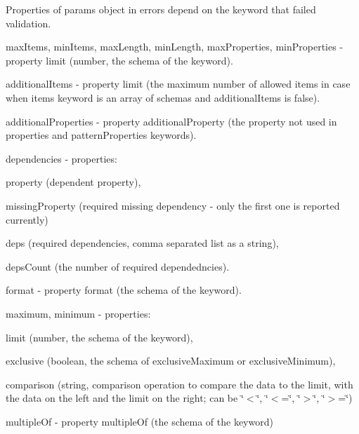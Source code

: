 Properties of {\ttfamily params} object in errors depend on the keyword that failed validation.


\begin{DoxyItemize}
\item {\ttfamily max\+Items}, {\ttfamily min\+Items}, {\ttfamily max\+Length}, {\ttfamily min\+Length}, {\ttfamily max\+Properties}, {\ttfamily min\+Properties} -\/ property {\ttfamily limit} (number, the schema of the keyword).
\item {\ttfamily additional\+Items} -\/ property {\ttfamily limit} (the maximum number of allowed items in case when {\ttfamily items} keyword is an array of schemas and {\ttfamily additional\+Items} is false).
\item {\ttfamily additional\+Properties} -\/ property {\ttfamily additional\+Property} (the property not used in {\ttfamily properties} and {\ttfamily pattern\+Properties} keywords).
\item {\ttfamily dependencies} -\/ properties\+:
\begin{DoxyItemize}
\item {\ttfamily property} (dependent property),
\item {\ttfamily missing\+Property} (required missing dependency -\/ only the first one is reported currently)
\item {\ttfamily deps} (required dependencies, comma separated list as a string),
\item {\ttfamily deps\+Count} (the number of required dependedncies).
\end{DoxyItemize}
\item {\ttfamily format} -\/ property {\ttfamily format} (the schema of the keyword).
\item {\ttfamily maximum}, {\ttfamily minimum} -\/ properties\+:
\begin{DoxyItemize}
\item {\ttfamily limit} (number, the schema of the keyword),
\item {\ttfamily exclusive} (boolean, the schema of {\ttfamily exclusive\+Maximum} or {\ttfamily exclusive\+Minimum}),
\item {\ttfamily comparison} (string, comparison operation to compare the data to the limit, with the data on the left and the limit on the right; can be \char`\"{}$<$\char`\"{}, \char`\"{}$<$=\char`\"{}, \char`\"{}$>$\char`\"{}, \char`\"{}$>$=\char`\"{})
\end{DoxyItemize}
\item {\ttfamily multiple\+Of} -\/ property {\ttfamily multiple\+Of} (the schema of the keyword)

\end{DoxyItemize}

